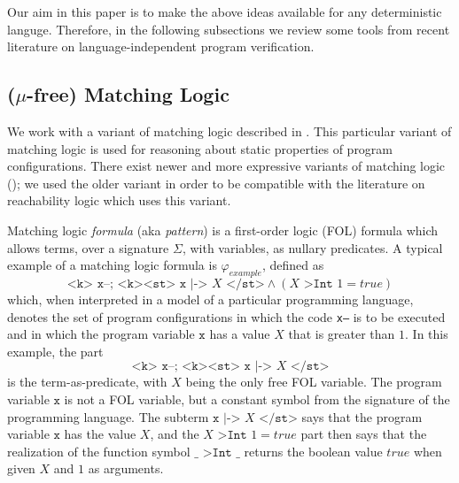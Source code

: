 Our aim in this paper is to make the above ideas available for any deterministic languge.
Therefore, in the following subsections we review some tools from recent literature
on language-independent program verification.

\subsection{($\mu$-free) Matching Logic}

We work with a variant of matching logic described in
\cite{StefanescuCMMSR19,RosuSCM13lics}.
This particular variant of matching logic is used for reasoning about static properties of program configurations.
There exist newer and more expressive variants of matching logic (\cite{MmL, MLexplained});
we used the older variant in order to be compatible with the literature on reachability logic which uses this variant.

Matching logic \emph{formula} (aka \emph{pattern}) is a first-order logic (FOL) formula which allows terms,
over a signature $\Sigma$, with variables, as nullary predicates.
A typical example of a matching logic formula is $\varphi_{\mathit{example}}$, defined as
\begin{equation}\label{eqn:exampleMLPattern}
\texttt{<k> x--; <k><st> x} \texttt{ |-> } X\texttt{ </st>} \land (X \texttt{ >Int } 1 = \mathit{true})
\end{equation}
which, when interpreted in a model of a particular programming language,
denotes the set of program configurations in which the code \texttt{x--} is to be executed
and in which the program variable $\texttt{x}$ has a value $X$ that is greater than $1$.
In this example, the part
\begin{equation*}
    \texttt{<k> x--; <k><st> x} \texttt{ |-> } X\texttt{ </st>}
\end{equation*}
is the term-as-predicate, with $X$ being the only free FOL variable.
The program variable $\texttt{x}$ is not a FOL variable, but a constant symbol from the signature of the programming language.
The subterm $\texttt{x} \texttt{ |-> } X\texttt{ </st>}$ says that the program variable $\texttt{x}$
has the value $X$, and the $X \texttt{ >Int } 1 = \mathit{true}$ part then says that the realization
of the function symbol $\_ \texttt{ >Int } \_$ returns the boolean value $\mathit{true}$ when given $X$ and $1$
as arguments.

